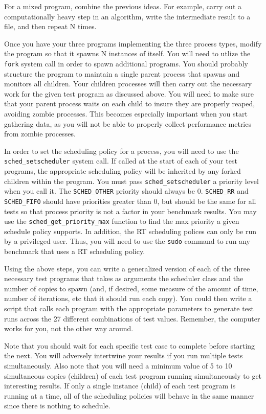 \documentclass[12pt]{article}
\begin{document}
For a mixed program, combine the previous ideas. For example, carry out a
computationally heavy step in an algorithm, write the intermediate
result to a file, and then repeat N times.

Once you have your three programs implementing the three process types,
modify the program so that it spawns N instances of itself. You will
need to utlize the \texttt{fork} system call in order to spawn
additional programs. You should probably structure the program to
maintain a single parent process that spawns and monitors all
children. Your children processes will then carry out the necessary
work for the given test program as discussed above.
You will need to make sure that your parent process waits on
each child to insure they are properly reaped, avoiding zombie
processes. This becomes especially important when you start gathering data,
as you will not be able to properly collect performance metrics from
zombie processes. 

In order to set the scheduling policy for a process, you will need to
use the \texttt{sched\_setscheduler} system call. If called at the start
of each of your test programs, the appropriate scheduling policy
will be inherited by any forked children within the program. You must pass
\texttt{sched\_setscheduler} a priority level when you call it.
The \texttt{SCHED\_OTHER} priority should always be
0. \texttt{SCHED\_RR} and \texttt{SCHED\_FIFO} should have priorities
greater than 0, but should be the same for all tests so that process
priority is not a factor in your benchmark results. You may use the
\texttt{sched\_get\_priority\_max} function to find the max priority a
given schedule policy supports. In addition, the RT scheduling
polices can only be run by a privileged user. Thus, you will need to
use the \texttt{sudo} command to run any benchmark that uses a RT
scheduling policy.

Using the above steps, you can write a generalized version of each
of the three necessary test programs that takes as arguments the
scheduler class and
the number of copies to spawn (and, if desired, some measure of the
amount of time, number of iterations, etc that it should run each copy).
You could then write a script that calls each program with the
appropriate parameters to generate test runs
across the 27 different combinations of test values. Remember, the
computer works for you, not the other way around.

Note that you
should wait for each specific test case to complete before
starting the next. You will adversely intertwine your results if you
run multiple tests simultaneously. Also note that you will
need a minimum value of 5 to 10 simultaneous copies (children) of each test
program running simultaneously to get interesting results. If only a
single instance (child) of each test program is running at a time, all of the
scheduling policies will behave in the same manner since there is
nothing to schedule.
\end{document}

